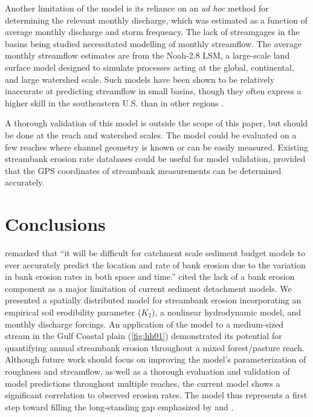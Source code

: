 \documentclass[preprint, review, authoryear, 12pt]{elsarticle}
\begin{document}
Another limitation of the model is its reliance on an \emph{ad hoc} method for determining the relevant monthly discharge, which was estimated as a function of average monthly discharge and storm frequency. The lack of streamgages in the basins being studied necessitated modelling of monthly streamflow. The average monthly streamflow estimates are from the Noah-2.8 LSM, a large-scale land surface model designed to simulate processes acting at the global, continental, and large watershed scale. Such models have been shown to be relatively inaccurate at predicting streamflow in small basins, though they often express a higher skill in the southeastern U.S. than in other regions \citep{Xia2012}.

A thorough validation of this model is outside the scope of this paper, but should be done at the reach and watershed scales. The model could be evaluated on a few reaches where channel geometry is known or can be easily measured. Existing streambank erosion rate databases could be useful for model validation, provided that the GPS coordinates of streambank measurements can be determined accurately.

\section{Conclusions}

\citet{Bartley2008} remarked that ``it will be difficult for catchment scale sediment budget models to ever accurately predict the location and rate of bank erosion due to the variation in bank erosion rates in both space and time.'' \citet{DeVente2013} cited the lack of a bank erosion component as a major limitation of current sediment detachment models. We presented a spatially distributed model for streambank erosion incorporating an empirical soil erodibility parameter ($K_2$), a nonlinear hydrodynamic model, and monthly discharge forcings. An application of the model to a medium-sized stream in the Gulf Coastal plain (\cref{fig:hh01}) demonstrated its potential for quantifying annual streambank erosion throughout a mixed forest/pasture reach. Although future work should focus on improving the model's parameterization of roughness and streamflow, as well as a thorough evaluation and validation of model predictions throughout multiple reaches, the current model shows a significant correlation to observed erosion rates. The model thus represents a first step toward filling the long-standing gap emphasized by \citet{Bartley2008} and \citet{DeVente2013}. 
\end{document}
